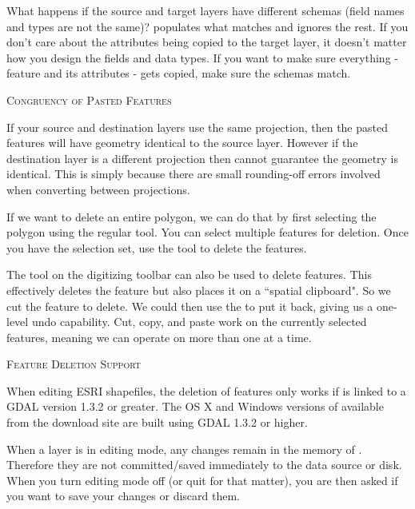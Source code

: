 What happens if the source and target layers have
different schemas (field names and types are not the same)? \qg populates
what matches and ignores the rest. If you don't care about the attributes
being copied to the target layer, it doesn't matter how you design the
fields and data types. If you want to make sure everything - feature and its
attributes - gets copied, make sure the schemas match.

\begin{Tip}\caption{\textsc{Congruency of Pasted Features}}
If your source and destination layers use the
same projection, then the pasted features will have
geometry identical to the source layer.
However if the destination layer is a different projection
then \qg cannot guarantee the geometry is identical.
This is simply because there are small rounding-off errors
involved when converting between projections.
\end{Tip}


If we want to delete an entire polygon, we can do that by first selecting 
the polygon using the regular  tool. You can select 
multiple features for deletion. Once you have the selection set, use the 
 tool to delete the features. 

The  tool on the digitizing toolbar can
also be used to delete features. This effectively deletes the feature but
also places it on a ``spatial clipboard". So we cut the feature to delete. 
We could then use the  to put it back, giving us a one-level undo 
capability. Cut, copy, and paste work on the currently selected features, 
meaning we can operate on more than one at a time.

\begin{Tip}\caption{\textsc{Feature Deletion Support}}
When editing ESRI shapefiles, the deletion
of features only works if \qg is linked to a GDAL version 1.3.2 or greater. 
The OS X and Windows versions of \qg available from the download site are built 
using GDAL 1.3.2 or higher.
\end{Tip}


When a layer is in editing mode, any changes remain in the memory of \qg.
Therefore they are not committed/saved immediately to the data source or disk.
When you turn editing mode off (or quit \qg for that matter), 
you are then asked if you want to save your
changes or discard them.

